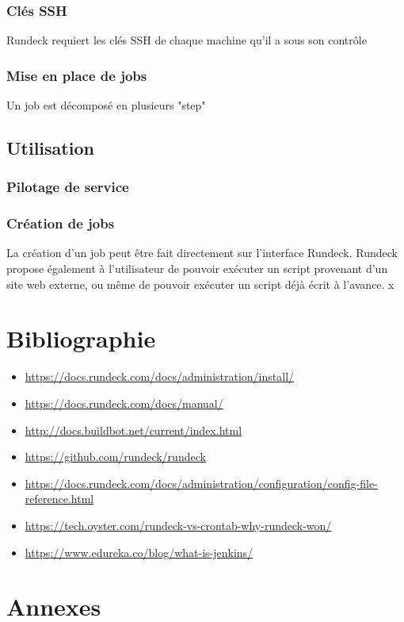 \documentclass[12pt]{article}
\begin{document}
\subsubsection{Clés SSH}
Rundeck requiert les clés SSH de chaque machine qu'il a sous son contrôle

\subsubsection{Mise en place de jobs}
Un job est décomposé en plusieurs "step"

\subsection{Utilisation}
\subsubsection{Pilotage de service}
\subsubsection{Création de jobs}
La création d'un job peut être fait directement sur l'interface Rundeck. Rundeck propose également à l'utilisateur de pouvoir exécuter un script provenant d'un site web externe, ou même de pouvoir exécuter un script déjà écrit à l'avance. x

\newpage
\section{Bibliographie}

\begin{itemize}
    \item \url{https://docs.rundeck.com/docs/administration/install/}
    \item \url{https://docs.rundeck.com/docs/manual/}
    \item \url{http://docs.buildbot.net/current/index.html}
    \item \url{https://github.com/rundeck/rundeck}
    \item \url{https://docs.rundeck.com/docs/administration/configuration/config-file-reference.html}
    \item \url{https://tech.oyster.com/rundeck-vs-crontab-why-rundeck-won/}
    \item \url{https://www.edureka.co/blog/what-is-jenkins/}
\end{itemize}

\newpage
\section{Annexes}
\end{document}
